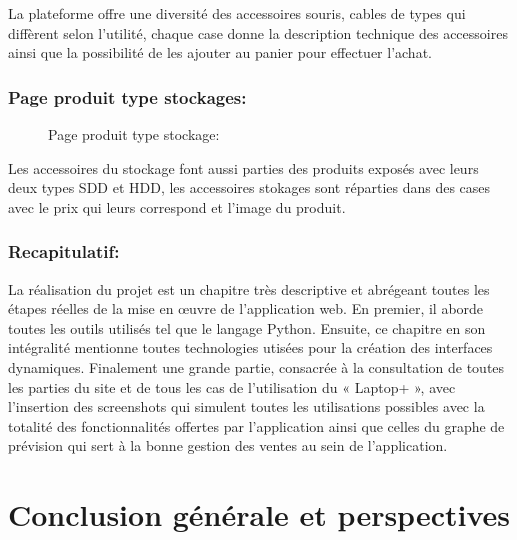\documentclass[a4paper]{report}
\begin{document}
\begin{doublespace}
\begin{doublespace}
\begin{doublespace}
\begin{doublespace}
\begin{doublespace}
                    La plateforme offre une diversité des accessoires
                    souris, cables de types qui diffèrent selon l'utilité, chaque case donne la
                    description technique des accessoires ainsi que la possibilité de les ajouter
                    au panier pour effectuer l'achat.

                    \subsection{Page produit type stockages:}
                    \begin{figure}[H]
                        \begin{center}
                            \caption{Page produit type stockage:}
                        \end{center}
                    \end{figure}

                    Les accessoires du stockage font aussi parties des
                    produits exposés avec leurs deux types SDD et HDD, les accessoires stokages
                    sont réparties dans des cases avec le prix qui leurs correspond et l'image du
                    produit.
                    \subsection{Recapitulatif:}
                    La réalisation du projet est un chapitre très
                    descriptive et abrégeant toutes les étapes réelles de la mise en œuvre de
                    l'application web. En premier, il aborde toutes les outils utilisés tel que le
                    langage  Python. Ensuite, ce chapitre en son intégralité mentionne toutes
                    technologies utisées pour la création des interfaces dynamiques. Finalement une
                    grande partie, consacrée à la consultation de toutes les parties du site et de
                    tous les cas de l’utilisation du « Laptop+ », avec l’insertion des screenshots
                    qui simulent toutes les utilisations possibles avec la totalité des
                    fonctionnalités offertes par l'application ainsi que celles du graphe de
                    prévision qui sert à la bonne gestion des ventes au sein de l'application.
                    \chapter{Conclusion générale et perspectives}
                    \fancyhead[L]{\hspace*{5cm}}

\end{doublespace}
\end{doublespace}
\end{doublespace}
\end{doublespace}
\end{doublespace}
\end{document}
